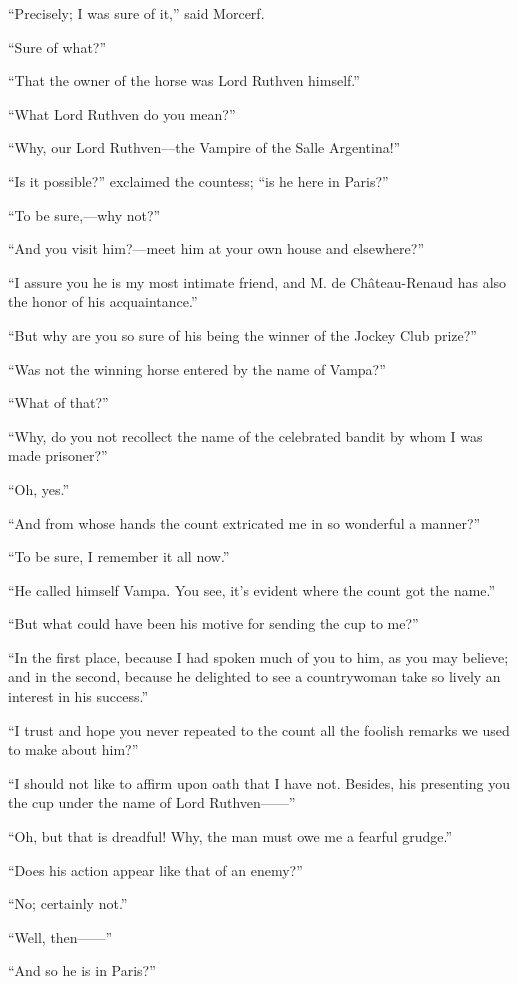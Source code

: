 “Precisely; I was sure of it,” said Morcerf.

“Sure of what?”

“That the owner of the horse was Lord Ruthven himself.”

“What Lord Ruthven do you mean?”

“Why, our Lord Ruthven—the Vampire of the Salle Argentina!”

“Is it possible?” exclaimed the countess; “is he here in Paris?”

“To be sure,—why not?”

“And you visit him?—meet him at your own house and elsewhere?”

“I assure you he is my most intimate friend, and M. de Château-Renaud
has also the honor of his acquaintance.”

“But why are you so sure of his being the winner of the Jockey Club
prize?”

“Was not the winning horse entered by the name of Vampa?”

“What of that?”

“Why, do you not recollect the name of the celebrated bandit by whom I
was made prisoner?”

“Oh, yes.”

“And from whose hands the count extricated me in so wonderful a
manner?”

“To be sure, I remember it all now.”

“He called himself Vampa. You see, it’s evident where the count got the
name.”

“But what could have been his motive for sending the cup to me?”

“In the first place, because I had spoken much of you to him, as you
may believe; and in the second, because he delighted to see a
countrywoman take so lively an interest in his success.”

“I trust and hope you never repeated to the count all the foolish
remarks we used to make about him?”

“I should not like to affirm upon oath that I have not. Besides, his
presenting you the cup under the name of Lord Ruthven——”

“Oh, but that is dreadful! Why, the man must owe me a fearful grudge.”

“Does his action appear like that of an enemy?”

“No; certainly not.”

“Well, then——”

“And so he is in Paris?”


